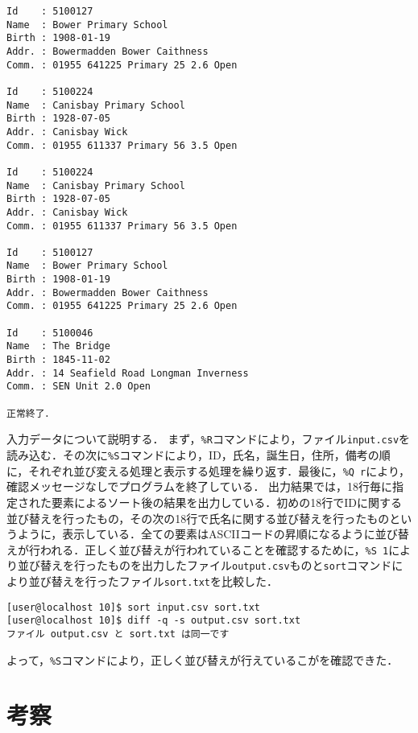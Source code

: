 {\begin{verbatim}
Id    : 5100127
Name  : Bower Primary School
Birth : 1908-01-19
Addr. : Bowermadden Bower Caithness
Comm. : 01955 641225 Primary 25 2.6 Open

Id    : 5100224
Name  : Canisbay Primary School
Birth : 1928-07-05
Addr. : Canisbay Wick
Comm. : 01955 611337 Primary 56 3.5 Open

Id    : 5100224
Name  : Canisbay Primary School
Birth : 1928-07-05
Addr. : Canisbay Wick
Comm. : 01955 611337 Primary 56 3.5 Open

Id    : 5100127
Name  : Bower Primary School
Birth : 1908-01-19
Addr. : Bowermadden Bower Caithness
Comm. : 01955 641225 Primary 25 2.6 Open

Id    : 5100046
Name  : The Bridge
Birth : 1845-11-02
Addr. : 14 Seafield Road Longman Inverness
Comm. : SEN Unit 2.0 Open

正常終了．

 \end{verbatim}
}

入力データについて説明する．
まず，\verb|%R|コマンドにより，ファイル\verb|input.csv|を読み込む．その次に\verb|%S|コマンドにより，ID，氏名，誕生日，住所，備考の順に，それぞれ並び変える処理と表示する処理を繰り返す．最後に，\verb|%Q r|により，確認メッセージなしでプログラムを終了している．
出力結果では，18行毎に指定された要素によるソート後の結果を出力している．初めの18行でIDに関する並び替えを行ったもの，その次の18行で氏名に関する並び替えを行ったものというように，表示している．全ての要素はASCIIコードの昇順になるように並び替えが行われる．正しく並び替えが行われていることを確認するために，\verb|%S 1|により並び替えを行ったものを出力したファイル\verb|output.csv|ものと\verb|sort|コマンドにより並び替えを行ったファイル\verb|sort.txt|を比較した．

{\fontsize{10pt}{11pt} \selectfont
 \begin{verbatim}
[user@localhost 10]$ sort input.csv sort.txt
[user@localhost 10]$ diff -q -s output.csv sort.txt
ファイル output.csv と sort.txt は同一です
 \end{verbatim}
}

よって，\verb|%S|コマンドにより，正しく並び替えが行えているこがを確認できた．

\section{考察}

